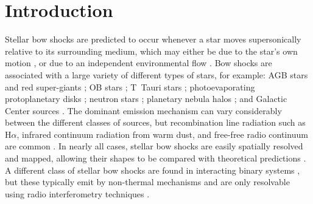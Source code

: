 \documentclass[useAMS, usenatbib, a4paper]{mnras}
\begin{document}
\section{Introduction}
\label{sec:rip-introduction}
Stellar bow shocks are predicted to occur whenever a star moves
supersonically relative to its surrounding medium, which may either be
due to the star's own motion \citetext{runaways, e.g.,
  \citealp{Blaauw:1961a}}, or due to an independent environmental flow
\citetext{weather vanes, e.g., \citealp{Povich:2008a}}.  Bow shocks
are associated with a large variety of different types of stars, for
example: AGB stars and red super-giants \citep{Cox:2012a}; OB stars
\citep{Kobulnicky:2017a}; T~Tauri stars \citep{Gull:1979a,
  Henney:2013a}; photoevaporating protoplanetary disks
\citep{Garcia-Arredondo:2001a, Smith:2005a}; neutron stars
\citep{Cordes:1993a, Brownsberger:2014a}; planetary nebula halos
\citep{Ali:2012a}; and Galactic Center sources \citep{Geballe:2004a,
  Sanchez-Bermudez:2014a}.  The dominant emission mechanism can vary
considerably between the different classes of sources, but
recombination line radiation such as H\(\alpha\), infrared continuum
radiation from warm dust, and free-free radio continuum are common
\citep{Canto:2005a, Acreman:2016a, Meyer:2016a}.  In nearly all cases,
stellar bow shocks are easily spatially resolved and mapped, allowing
their shapes to be compared with theoretical predictions
\citep{Wilkin:1996a, Tarango-Yong:2018a}.  A different class of
stellar bow shocks are found in interacting binary systems
\citep{Stevens:1992a}, but these typically emit by non-thermal
mechanisms and are only resolvable using radio interferometry
techniques \citep{Contreras:1999a, Dzib:2013a}.
\end{document}
